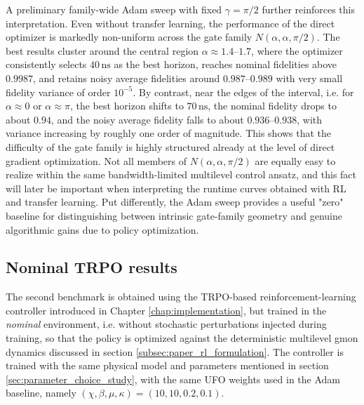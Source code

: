A preliminary family-wide Adam sweep with fixed \(\gamma=\pi/2\) further reinforces this interpretation. Even without transfer learning, the performance of the direct optimizer is markedly non-uniform across the gate family \(N(\alpha,\alpha,\pi/2)\). The best results cluster around the central region \(\alpha\approx 1.4\)--\(1.7\), where the optimizer consistently selects \(40\,\mathrm{ns}\) as the best horizon, reaches nominal fidelities above \(0.9987\), and retains noisy average fidelities around \(0.987\)--\(0.989\) with very small fidelity variance of order \(10^{-5}\). By contrast, near the edges of the interval, i.e. for \(\alpha\approx 0\) or \(\alpha\approx \pi\), the best horizon shifts to \(70\,\mathrm{ns}\), the nominal fidelity drops to about \(0.94\), and the noisy average fidelity falls to about \(0.936\)--\(0.938\), with variance increasing by roughly one order of magnitude. This shows that the difficulty of the gate family is highly structured already at the level of direct gradient optimization. Not all members of \(N(\alpha,\alpha,\pi/2)\) are equally easy to realize within the same bandwidth-limited multilevel control ansatz, and this fact will later be important when interpreting the runtime curves obtained with RL and transfer learning. Put differently, the Adam sweep provides a useful "zero" baseline for distinguishing between intrinsic gate-family geometry and genuine algorithmic gains due to policy optimization.





\subsection{Nominal TRPO results}
\label{subsec:nominal_trpo_results}


The second benchmark is obtained using the TRPO-based reinforcement-learning controller introduced in Chapter \ref{chap:implementation}, but trained in the \emph{nominal} environment, i.e. without stochastic perturbations injected during training, so that the policy is optimized against the deterministic multilevel gmon dynamics discussed in section \ref{subsec:paper_rl_formulation}. The controller is trained with the same physical model and parameters mentioned in section \ref{sec:parameter_choice_study}, with the same UFO weights used in the Adam baseline, namely \((\chi,\beta,\mu,\kappa)=(10,10,0.2,0.1)\).

